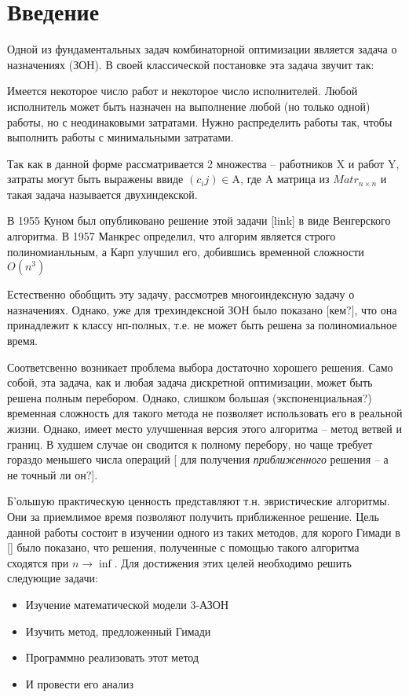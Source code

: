 \chapter{Введение}

Одной из фундаментальных задач комбинаторной оптимизации является задача о назначениях (ЗОН). 
В своей классической постановке эта задача звучит так: 

Имеется некоторое число работ и некоторое число исполнителей. Любой исполнитель может быть назначен на выполнение любой (но только одной) работы, но с неодинаковыми затратами. Нужно распределить работы так, чтобы выполнить работы с минимальными затратами.

Так как в данной форме рассматривается 2 множества -- работников $\mathrm{X}$ и работ $\mathrm{Y}$, затраты могут быть выражены ввиде $(c_ij) \in \mathrm{A}$, где $\mathrm{A}$ матрица из $Matr_{n \times n}$ и такая задача называется двухиндекской. 

В 1955 Куном был опубликовано решение этой задачи [link] в виде Венгерского алгоритма. В 1957 Манкрес определил, что 
алгорим является строго полиномианльным, а Карп улучшил его, добившись временной сложности $O(n^3)$

Естественно обобщить эту задачу, рассмотрев многоиндексную задачу о назначениях. Однако, уже 
для трехиндексной ЗОН было показано [кем?], что она принадлежит к классу нп-полных, т.е. не может быть решена за полиномиальное время. 

Соответсвенно возникает проблема выбора достаточно хорошего решения. Само собой, эта задача, как и любая задача дискретной оптимизации, может быть решена полным перебором. Однако, слишком большая (экспоненциальная?) временная сложность для такого метода не позволяет использовать его в реальной жизни. Однако, имеет место улучшенная версия этого алгоритма -- метод ветвей и границ. В худшем случае он сводится к полному перебору, но чаще требует гораздо меньшего числа операций [ для получения \textit{приближенного} решения -- а не точный ли он?].

Б'ольшую практическую ценность представляют т.н. эвристические алгоритмы. Они за приемлимое время позволяют получить приближенное решение. Цель данной работы состоит в изучении одного из таких методов, для корого Гимади в [] было показано, что решения, полученные с помощью такого алгоритма сходятся при $n \rightarrow \inf$. Для достижения этих целей необходимо решить следующие задачи: 

\begin{itemize}  
\item Изучение математической модели 3-АЗОН
\item Изучить метод, предложенный Гимади
\item Программно реализовать этот метод
\item И провести его анализ
\end{itemize}
